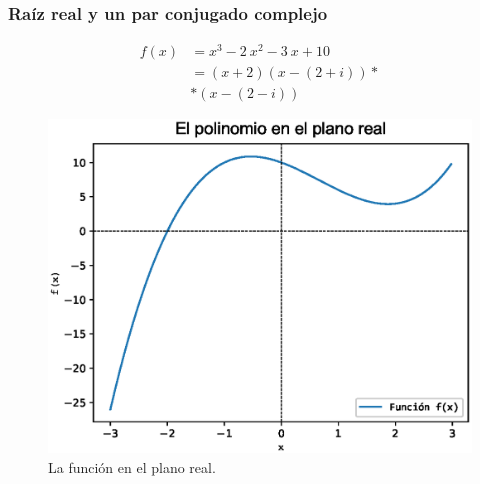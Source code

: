 \begin{frame}[fragile]
\captionsetup{justification=centering}
\frametitle{Raíz real y un par conjugado complejo}
\begin{minipage}{5cm}
\fontsize{12}{12}\selectfont
\begin{align*}
f(x) &= x^{3} - 2 \: x^{2} - 3 \: x + 10  \\
&= (x + 2)(x - (2 + i))* {}\\
&* (x - (2 - i))
\end{align*}
\end{minipage}
\hspace{0.5cm}
\begin{minipage}{5cm}
\begin{figure}
	\centering
	\includegraphics[scale=0.4]{Imagenes/raices_polinomio_2020_04.eps} 
	\caption{La función en el plano real.}
\end{figure}
\end{minipage}
\end{frame}
